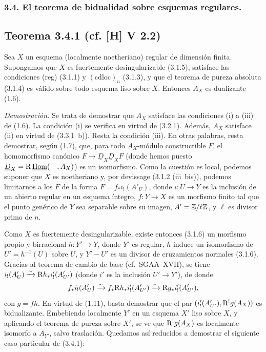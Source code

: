 \subsubsection*{3.4. El teorema de bidualidad sobre esquemas regulares.}

\subsection*{Teorema 3.4.1 (cf. [H] V 2.2)}
Sea $X$ un esquema (localmente noetheriano) regular de dimensión finita. Supongamos que $X$ es fuertemente desingularizable (3.1.5), satisface las condiciones (reg) (3.1.1) y $(\mathrm{cdloc})_n$ (3.1.3), y que el teorema de pureza absoluta (3.1.4) es válido sobre todo esquema liso sobre $X$. Entonces $A_X$ es dualizante (1.6).

\emph{Demostración.} Se trata de demostrar que $A_X$ satisface las condiciones (i) a (iii) de (1.6). La condición (i) se verifica en virtud de (3.2.1). Además, $A_X$ satisface (ii) en virtud de (3.3.1~b)). Resta la condición (iii). En otras palabras, resta demostrar, según (1.7), que, para todo $A_X$-módulo constructible $F$, el homomorfismo canónico $F \to \underline{D}_X \underline{D}_X F$ (donde hemos puesto $\underline{D}_X = \mathrm{R}\,\underline{\operatorname{Hom}}(\quad, A_X)$) es un isomorfismo. Como la cuestión es local, podemos suponer que $X$ es noetheriano y, por devissage (3.1.2 (iii~bis)), podemos limitarnos a los $F$ de la forma $F = f_{*}i_{!}(A'_U)$, donde $i : U \to Y$ es la inclusión de un abierto regular en un esquema íntegro, $f : Y \to X$ es un morfismo finito tal que el punto genérico de $Y$ sea separable sobre su imagen, $A' = \mathbb{Z}/\ell\mathbb{Z}$, y $\ell$ es divisor primo de $n$.

Como $X$ es fuertemente desingularizable, existe entonces (3.1.6) un morfismo propio y birracional $h : Y' \to Y$, donde $Y'$ es regular, $h$ induce un isomorfismo de $U' = h^{-1}(U)$ sobre $U$, y $Y' - U'$ es un divisor de cruzamientos normales (3.1.6). Gracias al teorema de cambio de base (cf.~SGAA~XVII), se tiene $i_{!}(A'_U) \xrightarrow{\sim} \mathrm{R} h_{*} i'_{!}(A'_{U'})$ (donde $i'$ es la inclusión $U' \to Y'$), de donde
\[
f_{*} i_{!}(A'_U) \xrightarrow{\sim} f_{*} \mathrm{R} h_{*} i'_{!}(A'_{U'}) \xrightarrow{\sim} \mathrm{R} g_{*} i'_{!}(A'_{U'}),
\]
con $g = fh$. En virtud de (1.11), basta demostrar que el par $(i'_{!}(A'_{U'}), \mathrm{R}^{!}g(A_X))$ es bidualizante. Embebiendo localmente $Y'$ en un esquema $X'$ liso sobre $X$, y aplicando el teorema de pureza sobre $X'$, se ve que $\mathrm{R}^{!}g(A_X)$ es localmente isomorfo a $A_{Y'}$, salvo traslación. Quedamos así reducidos a demostrar el siguiente caso particular de (3.4.1):

